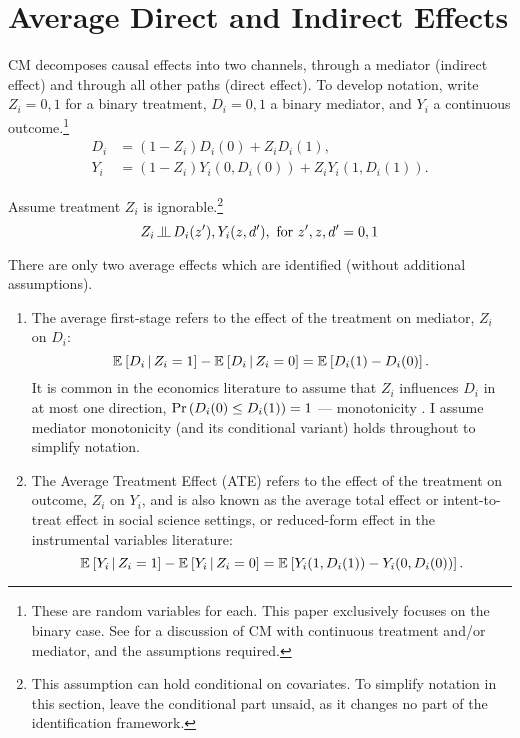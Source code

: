 \section{Average Direct and Indirect Effects}
\label{sec:mediation}
CM decomposes causal effects into two channels, through a mediator (indirect effect) and through all other paths (direct effect).
To develop notation, write $Z_i = 0, 1$ for a binary treatment, $D_i = 0, 1$ a binary mediator, and $Y_i$ a continuous outcome.\footnote{
    These are random variables for each.
    This paper exclusively focuses on the binary case.
    See \cite{huber2020direct} for a discussion of CM with continuous treatment and/or mediator, and the assumptions required.
}
\begin{align*}
    D_i &= (1 - Z_i) D_i(0)
        +   Z_i      D_i(1),  \\
    Y_i &= (1 - Z_i) Y_i(0, D_i(0))
        +   Z_i      Y_i(1, D_i(1)).
\end{align*}

Assume treatment $Z_i$ is ignorable.\footnote{
    This assumption can hold conditional on covariates.
    To simplify notation in this section, leave the conditional part unsaid, as it changes no part of the identification framework.
}
\[ Z_i \indep  D_i(z'), Y_i(z, d'), \text{ for } z', z, d' = 0, 1 \]

There are only two average effects which are identified (without additional assumptions).
\begin{enumerate}
    \item The average first-stage refers to the effect of the treatment on mediator, $Z_i$ on $D_i$:
    \[ \mathbb{E}_{} \left[ D_i \, \middle\vert \, Z_i = 1 \right] - \mathbb{E}_{} \left[ D_i \, \middle\vert \, Z_i = 0 \right]
        = \mathbb{E}_{} \left[ D_i(1) - D_i(0) \right]. \]
    It is common in the economics literature to assume that $Z_i$ influences $D_i$ in at most one direction, $\Pr\left( D_i(0) \leq D_i(1) \right) = 1$ --- monotonicity \citep{imbens1994identification}.
    I assume mediator monotonicity (and its conditional variant) holds throughout to simplify notation.
    \item The Average Treatment Effect (ATE) refers to the effect of the treatment on outcome, $Z_i$ on $Y_i$, and is also known as the average total effect or intent-to-treat effect in social science settings, or reduced-form effect in the instrumental variables literature:
    \[ \mathbb{E}_{} \left[ Y_i \, \middle\vert \, Z_i = 1 \right] - \mathbb{E}_{} \left[ Y_i \, \middle\vert \, Z_i = 0 \right]
        = \mathbb{E}_{} \left[ Y_i(1, D_i(1)) - Y_i(0, D_i(0)) \right]. \]
\end{enumerate}


